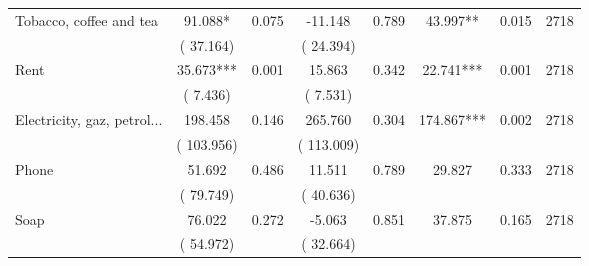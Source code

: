 \begin{tabular}{l*{7}{c}}
 Tobacco, coffee and tea       &             91.088*       &        0.075  &            -11.148       &        0.789  &             43.997**       &              0.015 &  2718 \\ 
                       &       (      37.164)             &                               &       (      24.394)                     &                               &                                               &                                &                      \\ 

 Rent       &             35.673***       &        0.001  &             15.863       &        0.342  &             22.741***       &              0.001 &  2718 \\ 
                       &       (       7.436)             &                               &       (       7.531)                     &                               &                                               &                                &                      \\ 

 Electricity, gaz, petrol...       &            198.458       &        0.146  &            265.760       &        0.304  &            174.867***       &              0.002 &  2718 \\ 
                       &       (     103.956)             &                               &       (     113.009)                     &                               &                                               &                                &                      \\ 

 Phone       &             51.692       &        0.486  &             11.511       &        0.789  &             29.827       &              0.333 &  2718 \\ 
                       &       (      79.749)             &                               &       (      40.636)                     &                               &                                               &                                &                      \\ 

 Soap       &             76.022       &        0.272  &             -5.063       &        0.851  &             37.875       &              0.165 &  2718 \\ 
                       &       (      54.972)             &                               &       (      32.664)                     &                               &                                               &                                &                      \\ 


\end{tabular}
